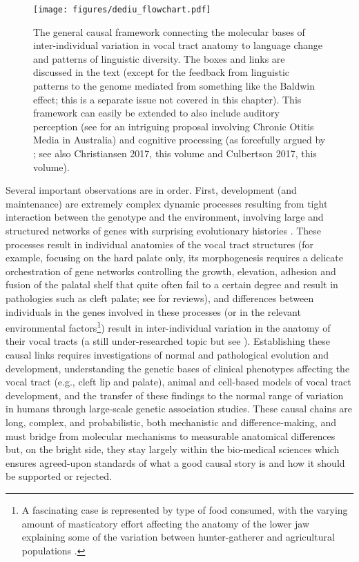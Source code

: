 \documentclass[output=paper]{langsci/langscibook}
\begin{document}
\begin{figure}
\texttt{[image: figures/dediu\_flowchart.pdf]}
\caption{The general causal framework connecting the molecular bases of inter-individual variation in vocal tract anatomy to language change and patterns of linguistic diversity. The boxes and links are discussed in the text (except for the feedback from linguistic patterns to the genome mediated from something like the Baldwin effect; this is a separate issue not covered in this chapter). This framework can easily be extended to also include auditory perception (see \citealt{Butcher2006} for an intriguing proposal involving Chronic Otitis Media in Australia) and cognitive processing (as forcefully argued by \citealt{Christiansen2008}; see also Christiansen 2017, this volume and Culbertson 2017, this volume).  }
\label{fig:dediu:1}
\end{figure}
  
Several important observations are in order. First, development (and maintenance) are extremely complex dynamic processes resulting from tight interaction between the genotype and the environment, involving large and structured networks of genes with surprising evolutionary histories \citep[e.g.,][]{Carroll2011}. These processes \citep{Fitch1999} result in individual anatomies of the vocal tract structures (for example, focusing on the hard palate only, its morphogenesis requires a delicate orchestration of gene networks controlling the growth, elevation, adhesion and fusion of the palatal shelf that quite often fail to a certain degree and result in pathologies such as cleft palate; see \citealt{Bush2012,Dixon2011} for reviews), and differences between individuals in the genes involved in these processes (or in the relevant environmental factors\footnote{A fascinating case is represented by type of food consumed, with the varying amount of masticatory effort affecting the anatomy of the lower jaw explaining some of the variation between hunter-gatherer and agricultural populations \citep{Cramon-Taubadel2011}.}) result in inter-individual variation in the anatomy of their vocal tracts (a still under-researched topic but see \citealt{Praveen2011,Lammert2013,Lammert2011,You2008,Liu2012}). Establishing these causal links requires investigations of normal and pathological evolution and development, understanding the genetic bases of clinical phenotypes affecting the vocal tract (e.g., cleft lip and palate), animal and cell-based models of vocal tract development, and the transfer of these findings to the normal range of variation in humans through large-scale genetic association studies. These causal chains are long, complex, and probabilistic, both mechanistic and difference-making, and must bridge from molecular mechanisms to measurable anatomical differences but, on the bright side, they stay largely within the bio-medical sciences which ensures agreed-upon standards of what a good causal story is and how it should be supported or rejected.
\end{document}
